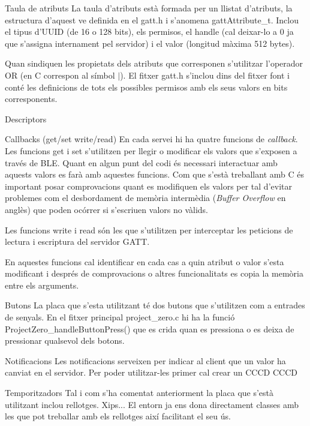 Taula de atributs
La taula d'atributs està formada per un llistat d'atributs, la estructura d'aquest ve definida en el gatt.h i s'anomena gattAttribute\_t.
Inclou el tipus d'UUID (de 16 o 128 bits), els permisos, el handle (cal deixar-lo a 0 ja que s'assigna internament pel servidor) i el valor (longitud màxima 512 bytes).

Quan sindiquen les propietats dels atributs que corresponen s'utilitzar l'operador OR (en C correspon al símbol $\mid$).
El fitxer gatt.h s'inclou dins del fitxer font i conté les definicions de tots els possibles permisos amb els seus valors en bits corresponents.

Descriptors


Callbacks (get/set write/read)
En cada servei hi ha quatre funcions de \textit{callback}.
Les funcions get i set s'utilitzen per llegir o modificar els valors que s'exposen a través de BLE.
Quant en algun punt del codi és necessari interactuar amb aquests valors es farà amb aquestes funcions.
Com que s'està treballant amb C és important posar comprovacions quant es modifiquen els valors per tal d'evitar problemes com el desbordament de memòria intermèdia (\textit{Buffer Overflow} en anglès) que poden ocórrer si s'escriuen valors no vàlids.

Les funcions write i read són les que s'utilitzen per interceptar les peticions de lectura i escriptura del servidor GATT.

En aquestes funcions cal identificar en cada cas a quin atribut o valor s'esta modificant i després de comprovacions o altres funcionalitats es copia la memòria entre els arguments.

Butons
La placa que s'esta utilitzant té dos butons que s'utilitzen com a entrades de senyals.
En el fitxer principal project\_zero.c hi ha la funció ProjectZero\_handleButtonPress() que es crida quan es pressiona o es deixa de pressionar qualsevol dels botons.

Notificacions
Les notificacions serveixen per indicar al client que un valor ha canviat en el servidor.
Per poder utilitzar-les primer cal crear un CCCD
CCCD


Temporitzadors
Tal i com s'ha comentat anteriorment la placa que s'està utilitzant inclou rellotges.
Xips...
El entorn ja ens dona directament classes amb les que pot treballar amb els rellotges així facilitant el seu ús.




